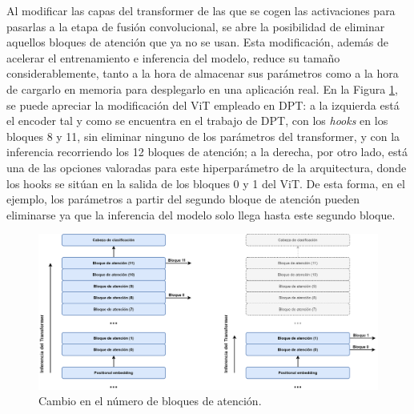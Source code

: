 Al modificar las capas del transformer de las que se cogen las activaciones para pasarlas a la etapa de fusión convolucional, se abre la posibilidad de eliminar aquellos bloques de atención que ya no se usan. Esta modificación, además de acelerar el entrenamiento e inferencia del modelo, reduce su tamaño considerablemente, tanto a la hora de almacenar sus parámetros como a la hora de cargarlo en memoria para desplegarlo en una aplicación real. En la Figura \ref{fig:attention_block_num}, se puede apreciar la modificación del ViT empleado en DPT: a la izquierda está el encoder tal y como se encuentra en el trabajo de DPT, con los \textit{hooks} en los bloques 8 y 11, sin eliminar ninguno de los parámetros del transformer, y con la inferencia recorriendo los 12 bloques de atención; a la derecha, por otro lado, está una de las opciones valoradas para este hiperparámetro de la arquitectura, donde los hooks se sitúan en la salida de los bloques 0 y 1 del ViT. De esta forma, en el ejemplo, los parámetros a partir del segundo bloque de atención pueden eliminarse ya que la inferencia del modelo solo llega hasta este segundo bloque.


\begin{figure}[H]
\centering
\includegraphics[width=\textwidth]{imagenes/DPT-cambio-bloques-transformer.png}
\caption{Cambio en el número de bloques de atención.}
\label{fig:attention_block_num}
\end{figure}



